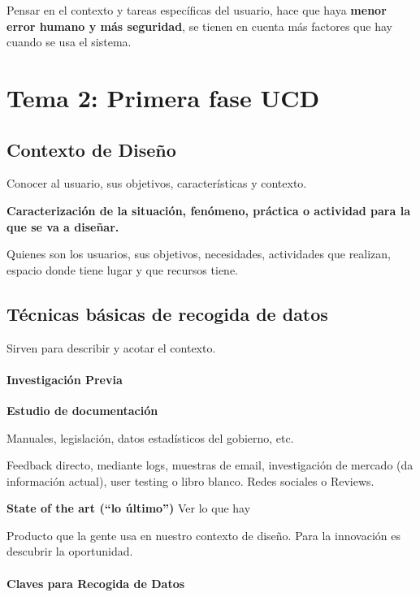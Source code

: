 \documentclass[12pt]{report} %
\begin{document}
Pensar en el contexto y tareas específicas del usuario, hace que haya
\textbf{menor error humano y más seguridad}, se tienen en cuenta más
factores que hay cuando se usa el sistema.

\chapter{Tema 2: Primera fase UCD}

\section{Contexto de Diseño}

Conocer al usuario, sus objetivos, características y contexto.

\textbf{Caracterización de la situación, fenómeno, práctica o actividad
para la que se va a diseñar.}

Quienes son los usuarios, sus objetivos, necesidades, actividades que
realizan, espacio donde tiene lugar y que recursos tiene.

\section{Técnicas básicas de recogida de
datos}

Sirven para describir y acotar el contexto.

\hypertarget{investigaciuxf3n-previa}{%
\subsubsection{Investigación Previa}\label{investigaciuxf3n-previa}}

\textbf{Estudio de documentación}

Manuales, legislación, datos estadísticos del gobierno, etc.

Feedback directo, mediante logs, muestras de email, investigación de
mercado (da información actual), user testing o libro blanco. Redes
sociales o Reviews.

\textbf{State of the art (``lo último'')} Ver lo que hay

Producto que la gente usa en nuestro contexto de diseño. Para la
innovación es descubrir la oportunidad.

\hypertarget{claves-para-recogida-de-datos}{%
\subsubsection{Claves para Recogida de
Datos}\label{claves-para-recogida-de-datos}}
\end{document}

